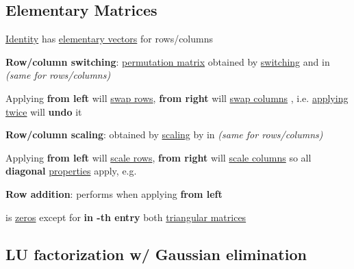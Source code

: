 \subsection*{Elementary Matrices}

\ul{Identity}
has \ul{elementary vectors} 
for rows/columns

\textbf{Row/column switching}: \ul{permutation matrix} 
obtained by \ul{switching}  and
 in  \emph{(same for rows/columns)}
\begin{itemize}

      \vItem
            Applying  \textbf{from left} will \ul{swap rows},
            \textbf{from right} will \ul{swap columns}
      \vItem
            , i.e. \ul{applying twice}
            will \textbf{undo} it
\end{itemize}

\textbf{Row/column scaling}:  obtained by \ul{scaling}  by \iMbox{\lambda} in
 \emph{(same for rows/columns)}
\begin{itemize}
      \vItem
            Applying  \textbf{from left} will \ul{scale rows},
            \textbf{from right} will \ul{scale columns}
      \vItem
            so all \textbf{diagonal} \ul{properties} apply,
            e.g. 
\end{itemize}

\textbf{Row addition}:
performs  when
applying \textbf{from left}
\begin{itemize}

      \vItem
             is \ul{zeros} except
            for \textbf{\iMbox{\lambda} in -th entry}
      \vItem
             both \ul{triangular matrices}
\end{itemize}


\subsection*{LU factorization w/ Gaussian elimination}

